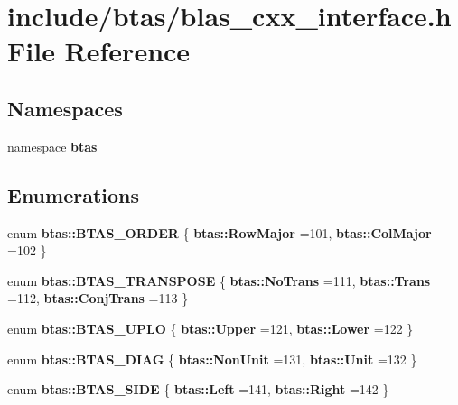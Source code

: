 \section{include/btas/blas\-\_\-cxx\-\_\-interface.h File Reference}
\label{dd/d03/blas__cxx__interface_8h}
\subsection*{Namespaces}
\begin{DoxyCompactItemize}
\item 
namespace {\bf btas}
\end{DoxyCompactItemize}
\subsection*{Enumerations}
\begin{DoxyCompactItemize}
\item 
enum {\bf btas\-::\-B\-T\-A\-S\-\_\-\-O\-R\-D\-E\-R} \{ {\bf btas\-::\-Row\-Major} =101, 
{\bf btas\-::\-Col\-Major} =102
 \}
\item 
enum {\bf btas\-::\-B\-T\-A\-S\-\_\-\-T\-R\-A\-N\-S\-P\-O\-S\-E} \{ {\bf btas\-::\-No\-Trans} =111, 
{\bf btas\-::\-Trans} =112, 
{\bf btas\-::\-Conj\-Trans} =113
 \}
\item 
enum {\bf btas\-::\-B\-T\-A\-S\-\_\-\-U\-P\-L\-O} \{ {\bf btas\-::\-Upper} =121, 
{\bf btas\-::\-Lower} =122
 \}
\item 
enum {\bf btas\-::\-B\-T\-A\-S\-\_\-\-D\-I\-A\-G} \{ {\bf btas\-::\-Non\-Unit} =131, 
{\bf btas\-::\-Unit} =132
 \}
\item 
enum {\bf btas\-::\-B\-T\-A\-S\-\_\-\-S\-I\-D\-E} \{ {\bf btas\-::\-Left} =141, 
{\bf btas\-::\-Right} =142
 \}
\end{DoxyCompactItemize}
